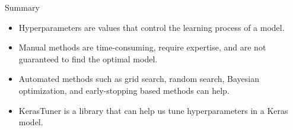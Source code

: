 \documentclass[9pt, aspectratio=169]{beamer}
\begin{document}
\begin{frame}
    {Summary}
    \begin{itemize}
        \item Hyperparameters are values that control the learning process of a model.
        \item Manual methods are time-consuming, require expertise, and are not guaranteed to find the optimal model.
        \item Automated methods such as grid search, random search, Bayesian optimization, and early-stopping based methods can help.
        \item KerasTuner is a library that can help us tune hyperparameters in a Keras model.
    \end{itemize}
\end{frame}
\end{document}
